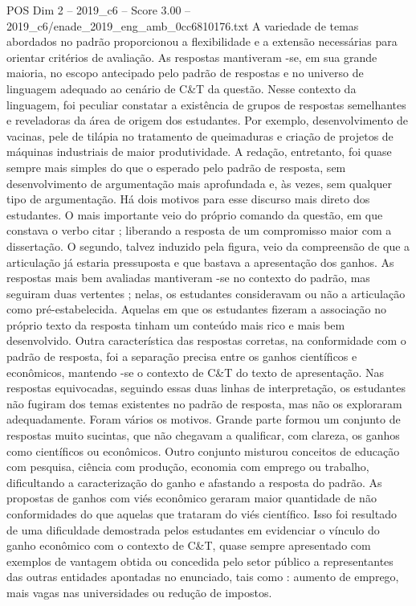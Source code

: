 \begin{textsample}{POS Dim 2 – 2019\_c6 – Score 3.00 – 2019\_c6/enade\_2019\_eng\_amb\_0cc6810176.txt}
A variedade de temas abordados no padrão proporcionou a flexibilidade e a extensão necessárias para orientar critérios de avaliação.
As respostas mantiveram -se, em sua grande maioria, no escopo antecipado pelo padrão de respostas e no universo de linguagem adequado ao cenário de C\&T da questão.
Nesse contexto da linguagem, foi peculiar constatar a existência de grupos de respostas semelhantes e reveladoras da área de origem dos estudantes.
Por exemplo, desenvolvimento de vacinas, pele de tilápia no tratamento de queimaduras e criação de projetos de máquinas industriais de maior produtividade.
A redação, entretanto, foi quase sempre mais simples do que o esperado pelo padrão de resposta, sem desenvolvimento de argumentação mais aprofundada e, às vezes, sem qualquer tipo de argumentação.
Há dois motivos para esse discurso mais direto dos estudantes.
O mais importante veio do próprio comando da questão, em que constava o verbo citar ; liberando a resposta de um compromisso maior com a dissertação.
O segundo, talvez induzido pela figura, veio da compreensão de que a articulação já estaria pressuposta e que bastava a apresentação dos ganhos.
As respostas mais bem avaliadas mantiveram -se no contexto do padrão, mas seguiram duas vertentes ; nelas, os estudantes consideravam ou não a articulação como pré-estabelecida.
Aquelas em que os estudantes fizeram a associação no próprio texto da resposta tinham um conteúdo mais rico e mais bem desenvolvido.
Outra característica das respostas corretas, na conformidade com o padrão de resposta, foi a separação precisa entre os ganhos científicos e econômicos, mantendo -se o contexto de C\&T do texto de apresentação.
Nas respostas equivocadas, seguindo essas duas linhas de interpretação, os estudantes não fugiram dos temas existentes no padrão de resposta, mas não os exploraram adequadamente.
Foram vários os motivos.
Grande parte formou um conjunto de respostas muito sucintas, que não chegavam a qualificar, com clareza, os ganhos como científicos ou econômicos.
Outro conjunto misturou conceitos de educação com pesquisa, ciência com produção, economia com emprego ou trabalho, dificultando a caracterização do ganho e afastando a resposta do padrão.
As propostas de ganhos com viés econômico geraram maior quantidade de não conformidades do que aquelas que trataram do viés científico.
Isso foi resultado de uma dificuldade demostrada pelos estudantes em evidenciar o vínculo do ganho econômico com o contexto de C\&T, quase sempre apresentado com exemplos de vantagem obtida ou concedida pelo setor público a representantes das outras entidades apontadas no enunciado, tais como : aumento de emprego, mais vagas nas universidades ou redução de impostos.

\end{textsample}
